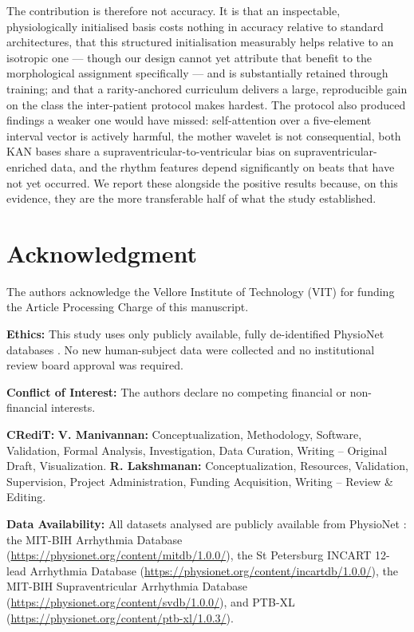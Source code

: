 \documentclass[journal,twoside,web]{ieeecolor}
\begin{document}
The contribution is therefore not accuracy. It is that an inspectable, physiologically initialised basis costs nothing in accuracy relative to standard architectures, that this structured initialisation measurably helps relative to an isotropic one --- though our design cannot yet attribute that benefit to the morphological assignment specifically --- and is substantially retained through training; and that a rarity-anchored curriculum delivers a large, reproducible gain on the class the inter-patient protocol makes hardest. The protocol also produced findings a weaker one would have missed: self-attention over a five-element interval vector is actively harmful, the mother wavelet is not consequential, both KAN bases share a supraventricular-to-ventricular bias on supraventricular-enriched data, and the rhythm features depend significantly on beats that have not yet occurred. We report these alongside the positive results because, on this evidence, they are the more transferable half of what the study established.

\section*{Acknowledgment}
The authors acknowledge the Vellore Institute of Technology (VIT) for funding the Article Processing Charge of this manuscript.

\textbf{Ethics:} This study uses only publicly available, fully de-identified PhysioNet databases \cite{goldberger_physiobank_2000}. No new human-subject data were collected and no institutional review board approval was required.

\textbf{Conflict of Interest:} The authors declare no competing financial or non-financial interests.

\textbf{CRediT:} \textbf{V. Manivannan:} Conceptualization, Methodology, Software, Validation, Formal Analysis, Investigation, Data Curation, Writing -- Original Draft, Visualization. \textbf{R. Lakshmanan:} Conceptualization, Resources, Validation, Supervision, Project Administration, Funding Acquisition, Writing -- Review \& Editing.

\textbf{Data Availability:} All datasets analysed are publicly available from PhysioNet \cite{goldberger_physiobank_2000}: the MIT-BIH Arrhythmia Database \cite{moody_impact_2001} (\url{https://physionet.org/content/mitdb/1.0.0/}), the St Petersburg INCART 12-lead Arrhythmia Database (\url{https://physionet.org/content/incartdb/1.0.0/}), the MIT-BIH Supraventricular Arrhythmia Database \cite{greenwald_improved_1990} (\url{https://physionet.org/content/svdb/1.0.0/}), and PTB-XL \cite{wagner_ptb-xl_2020} (\url{https://physionet.org/content/ptb-xl/1.0.3/}).
\end{document}
